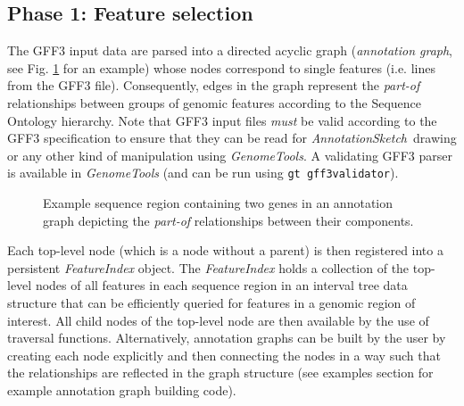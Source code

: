 \documentclass[a4paper]{scrreprt}
\newcommand{\AnnotationSketch}{\emph{AnnotationSketch}\ }
\begin{document}
\subsection{Phase 1: Feature selection}
The GFF3 input data are parsed into a directed acyclic graph (\emph{annotation graph}, see Fig. \ref{gfftree} for an example) whose nodes correspond to single features (i.e. lines from the GFF3 file). Consequently, edges in the graph represent the \emph{part-of} relationships between groups of genomic features according to the Sequence Ontology hierarchy. Note that GFF3 input files \emph{must} be valid according to the GFF3 specification to ensure that they can be read for \AnnotationSketch drawing or any other kind of manipulation using \emph{GenomeTools}. A validating GFF3 parser is available in \emph{GenomeTools} (and can be run using \texttt{gt gff3validator}).

\begin{figure}[ht]
\caption{Example sequence region containing two genes in an annotation graph depicting the \emph{part-of} relationships between their components.}
\label{gfftree}
\end{figure}
Each top-level node (which is a node without a parent) is then registered into a persistent \emph{FeatureIndex} object. The \emph{FeatureIndex} holds a collection of the top-level nodes of all features in each sequence region in an interval tree data structure that can be efficiently queried for features in a genomic region of interest. All child nodes of the top-level node are then available by the use of traversal functions. Alternatively, annotation graphs can be built by the user by creating each node explicitly and then connecting the nodes in a way such that the relationships are reflected in the graph structure (see examples section for example annotation graph building code).
\end{document}
